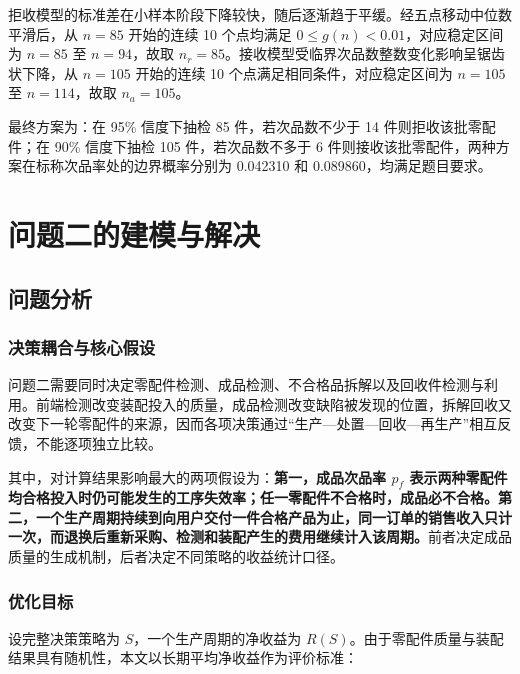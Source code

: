 \documentclass{cumcm}
\numberwithin{figure}{section}
\numberwithin{table}{section}
\begin{document}
拒收模型的标准差在小样本阶段下降较快，随后逐渐趋于平缓。经五点移动中位数平滑后，从 \(n=85\) 开始的连续 10 个点均满足 \(0\le g(n)<0.01\)，对应稳定区间为 \(n=85\) 至 \(n=94\)，故取 \(n_r=85\)。接收模型受临界次品数整数变化影响呈锯齿状下降，从 \(n=105\) 开始的连续 10 个点满足相同条件，对应稳定区间为 \(n=105\) 至 \(n=114\)，故取 \(n_a=105\)。

最终方案为：在 95\% 信度下抽检 85 件，若次品数不少于 14 件则拒收该批零配件；在 90\% 信度下抽检 105 件，若次品数不多于 6 件则接收该批零配件，两种方案在标称次品率处的边界概率分别为 0.042310 和 0.089860，均满足题目要求。

\FloatBarrier
\section{问题二的建模与解决}\label{ux95eeux9898ux4e8cux7684ux5efaux6a21ux4e0eux89e3ux51b3}

\subsection{问题分析}\label{ux95eeux9898ux5206ux6790}

\subsubsection{决策耦合与核心假设}\label{ux51b3ux7b56ux8026ux5408ux4e0eux6838ux5fc3ux5047ux8bbe}

问题二需要同时决定零配件检测、成品检测、不合格品拆解以及回收件检测与利用。前端检测改变装配投入的质量，成品检测改变缺陷被发现的位置，拆解回收又改变下一轮零配件的来源，因而各项决策通过``生产---处置---回收---再生产''相互反馈，不能逐项独立比较。

其中，对计算结果影响最大的两项假设为：\textbf{第一，成品次品率 \(p_f\) 表示两种零配件均合格投入时仍可能发生的工序失效率；任一零配件不合格时，成品必不合格。第二，一个生产周期持续到向用户交付一件合格产品为止，同一订单的销售收入只计一次，而退换后重新采购、检测和装配产生的费用继续计入该周期。}前者决定成品质量的生成机制，后者决定不同策略的收益统计口径。

\subsubsection{优化目标}\label{ux4f18ux5316ux76eeux6807}

设完整决策策略为 \(S\)，一个生产周期的净收益为 \(R(S)\)。由于零配件质量与装配结果具有随机性，本文以长期平均净收益作为评价标准：
\end{document}
